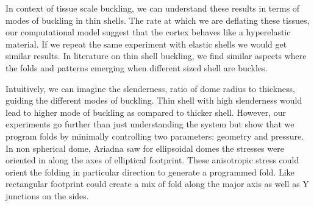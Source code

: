 In context of tissue scale buckling, we can understand these results in
terms of modes of buckling in thin shells. The rate at which we are
deflating these tissues, our computational model suggest that the cortex
behaves like a hyperelastic material. If we repeat the same experiment
with elastic shells we would get similar results. In literature on thin
shell buckling, we find similar aspects where the folds and patterns
emerging when different sized shell are buckles.

Intuitively, we can imagine the slenderness, ratio of dome radius to
thickness, guiding the different modes of buckling. Thin shell with high
slenderness would lead to higher mode of buckling as compared to thicker
shell. However, our experiments go further than just understanding the
system but show that we program folds by minimally controlling two
parameters: geometry and pressure. In non spherical dome, Ariadna saw
for ellipsoidal domes the stresses were oriented in along the axes of
elliptical footprint. These anisotropic stress could orient the folding
in particular direction to generate a programmed fold. Like rectangular
footprint could create a mix of fold along the major axis as well as Y
junctions on the sides.